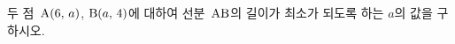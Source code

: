 두 점~$\mathrm{A}(6,\mkern3mu a)$, $\mathrm{B}(a,\mkern3mu 4)$에 대하여 선분~$\mathrm{AB}$의 길이가 최소가 되도록 하는 $a$의 값을 구하시오.
